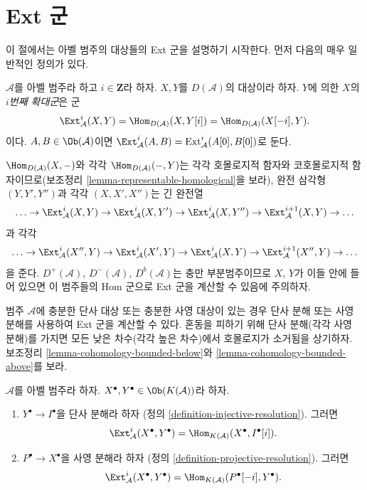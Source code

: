 \section{Ext 군}
\label{section-ext}

\noindent
이 절에서는 아벨 범주의 대상들의 Ext 군을 설명하기 시작한다. 먼저
다음의 매우 일반적인 정의가 있다.

\begin{definition}
\label{definition-ext}
$\mathcal{A}$를 아벨 범주라 하고 $i \in \mathbf{Z}$라 하자.
$X, Y$를 $D(\mathcal{A})$의 대상이라 하자. $Y$에 의한 $X$의
{\it $i$번째 확대군}은 군
$$
\Ext^i_\mathcal{A}(X, Y) =
\Hom_{D(\mathcal{A})}(X, Y[i]) =
\Hom_{D(\mathcal{A})}(X[-i], Y).
$$
이다. $A, B \in \Ob(\mathcal{A})$이면
$\Ext^i_\mathcal{A}(A, B) = \text{Ext}^i_\mathcal{A}(A[0], B[0])$로
둔다.
\end{definition}

\noindent
$\Hom_{D(\mathcal{A})}(X, -)$와 각각
$\Hom_{D(\mathcal{A})}(-, Y)$는 각각 호몰로지적 함자와 코호몰로지적
함자이므로(보조정리 \ref{lemma-representable-homological}을 보라),
완전 삼각형 $(Y, Y', Y'')$과 각각 $(X, X', X'')$는 긴 완전열
$$
\ldots \to
\Ext^i_\mathcal{A}(X, Y) \to
\Ext^i_\mathcal{A}(X, Y') \to
\Ext^i_\mathcal{A}(X, Y'') \to
\Ext^{i + 1}_\mathcal{A}(X, Y) \to \ldots
$$
과 각각
$$
\ldots \to
\Ext^i_\mathcal{A}(X'', Y) \to
\Ext^i_\mathcal{A}(X', Y) \to
\Ext^i_\mathcal{A}(X, Y) \to
\Ext^{i + 1}_\mathcal{A}(X'', Y) \to \ldots
$$
을 준다. $D^+(\mathcal{A})$, $D^-(\mathcal{A})$, $D^b(\mathcal{A})$는
충만 부분범주이므로 $X$, $Y$가 이들 안에 들어 있으면 이 범주들의
Hom 군으로 Ext 군을 계산할 수 있음에 주의하자.

\medskip\noindent
범주 $\mathcal{A}$에 충분한 단사 대상 또는 충분한 사영 대상이 있는
경우 단사 분해 또는 사영 분해를 사용하여 Ext 군을 계산할 수 있다.
혼동을 피하기 위해 단사 분해(각각 사영 분해)를 가지면 모든 낮은
차수(각각 높은 차수)에서 호몰로지가 소거됨을 상기하자. 보조정리
\ref{lemma-cohomology-bounded-below}와
\ref{lemma-cohomology-bounded-above}를 보라.

\begin{lemma}
\label{lemma-compute-ext-resolutions}
$\mathcal{A}$를 아벨 범주라 하자.
$X^\bullet, Y^\bullet \in \Ob(K(\mathcal{A}))$라 하자.
\begin{enumerate}
\item $Y^\bullet \to I^\bullet$을 단사 분해라 하자
(정의 \ref{definition-injective-resolution}). 그러면
$$
\Ext^i_\mathcal{A}(X^\bullet, Y^\bullet) =
\Hom_{K(\mathcal{A})}(X^\bullet, I^\bullet[i]).
$$
\item $P^\bullet \to X^\bullet$을 사영 분해라 하자
(정의 \ref{definition-projective-resolution}). 그러면
$$
\Ext^i_\mathcal{A}(X^\bullet, Y^\bullet) =
\Hom_{K(\mathcal{A})}(P^\bullet[-i], Y^\bullet).
$$
\end{enumerate}
\end{lemma}

